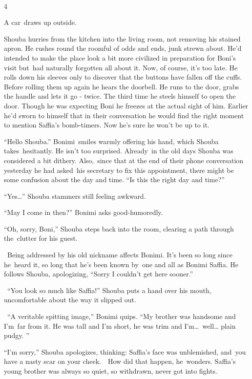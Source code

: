 \documentclass[twoside,11pt]{book}
\begin{document}
~

4

A car~draws up outside.{\ }

Shouba hurries from the kitchen into the living room, not removing his stained apron. He rushes round the roomful of
odds and ends, junk strewn about. He{}'d intended to make the place look a bit more civilized in preparation for Boni's
visit but~had naturally forgotten all about it. Now, of course, it's too late. He rolls down his sleeves only to
discover that the buttons have fallen off the cuffs. Before rolling them up again he hears the doorbell. He runs to the
door, grabs the handle and lets it go - twice. The third time he steels himself to open the door. Though he was
expecting Boni he freezes at the actual sight of him. Earlier he{}'d sworn to himself that in their conversation he
would find the right moment to mention Saffia's bomb-timers. Now he{}'s sure he won't be up to it.

``Hello Shouba.'' Bonimi~smiles warmly offering his hand, which Shouba takes~hesitantly. He
isn't too surprised. Already\ in the old days Shouba was considered a bit dithery.  Also,\ since that at the end of
their phone conversation yesterday he had asked~his secretary to fix this appointment, there might be some confusion
about the day and time. ``Is this the right day and time?'' 

``Yes{\dots}'' Shouba stammers still feeling awkward.

``May I come in then?'' Bonimi asks good-humoredly.

``Oh, sorry, Boni,'' Shouba steps back into the room, clearing a path through the~clutter for
his guest. 

~Being addressed by his old nickname affects Bonimi. It's been so long since he~heard it, so long that he's been known
by{\ }one and all as Bonimi Saffia. He follows Shouba, apologizing, ``Sorry I
couldn't get here sooner.''

~``You look so much like Saffia!'' Shouba puts a hand over his mouth, uncomfortable about the
way it slipped out.

~``A veritable spitting image,'' Bonimi quips. ``My brother was handsome and
I'm~far from it. He was tall and I'm short, he was trim and I'm{\dots}\ well{\dots} plain pudgy. '' 

``I'm sorry,'' Shouba apologizes, thinking: Saffia's face was unblemished,
and{\ }you have a nasty scar on your cheek.\ \ How did that happen,
he\ wonders. Saffia's young brother was always so quiet, so withdrawn, never got into fights.
\end{document}
